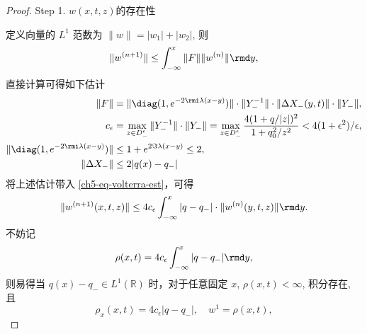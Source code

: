 \begin{proof}
    Step 1. $w(x,t,z)$的存在性

    定义向量的 $ L^{1} $ 范数为 $ \|w\| = |w_{1}| + |w_{2}| $, 则
    \begin{equation}
        \|w^{(n+1)}\| \leq \int_{-\infty}^{x} \|F\| \|w^{(n)}\| \rmd y,
        \label{ch5-eq-volterra-est}
    \end{equation}
    直接计算可得如下估计
    \begin{align}
        \|F \|                                   & = \| \diag(1, e^{-2 \rmi \lambda (x-y)}) \| \cdot \|Y_{-}^{-1}\| \cdot \| \Delta X_{-}(y,t) \| \cdot \| Y_{-} \|,
        \label{ch5-eq-volterra-est-f}                                                                                                                                                                                       \\
        c_{\epsilon}                             & = \max_{z \in D_{-}^{\epsilon}} \|Y_{-}^{-1}\| \cdot \| Y_{-} \| = \max_{z \in D_{-}^{\epsilon}} \frac{4(1+ q/|z|)^{2}}{1+q_{0}^{2}/z^{2}} < 4(1+\epsilon^{2})/\epsilon,
        \label{ch5-eq-volterra-est-ceps}                                                                                                                                                                                    \\
        \| \diag(1, e^{-2 \rmi \lambda (x-y)})\| & \leq 1+ e^{2\Im\lambda (x-y)}  \leq 2,
        \label{ch5-eq-volterra-est-diag}                                                                                                                                                                                    \\
        \| \Delta X_{-} \|                       & \leq 2 | q(x) - q_{-} |
        \label{ch5-eq-volterra-est-dx}
    \end{align}
    将上述估计带入 \eqref{ch5-eq-volterra-est}，可得
    \begin{equation}
        \|w^{(n+1)}(x,t,z)\| \leq 4 c_{\epsilon} \int_{-\infty}^{x} |q-q_{-}| \cdot \|w^{(n)}(y,t,z) \| \rmd y.
        \label{ch5-eq-volterra-est2}
    \end{equation}
    不妨记
    \begin{equation}
        \rho(x,t) = 4 c_{\epsilon} \int_{-\infty}^{x} |q-q_{-}| \rmd y,
    \end{equation}
    则易得当 $ q(x) - q_{-} \in L^{1}(\mathbb{R}) $ 时，对于任意固定 $x$, $ \rho(x,t) < \infty $, 积分存在, 且
    \begin{equation}
        \rho_{x}(x,t) = 4 c_{\epsilon} |q-q_{-}|, \quad w^{1} = \rho(x,t),

\end{equation}
\end{proof}
